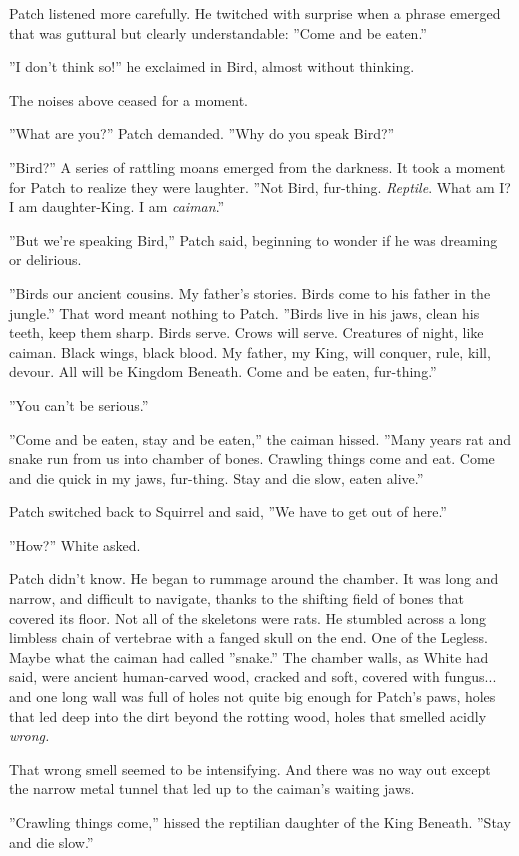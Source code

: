 \documentclass[12pt]{book}
\begin{document}
Patch listened more carefully. He twitched with surprise when a phrase emerged that was guttural but clearly understandable: ''Come and be eaten.''\par
 ''I don't think so!'' he exclaimed in Bird, almost without thinking.\par
 The noises above ceased for a moment.\par
 ''What are you?'' Patch demanded. ''Why do you speak Bird?''\par
 ''Bird?'' A series of rattling moans emerged from the darkness. It took a moment for Patch to realize they were laughter. ''Not Bird, fur-thing. {\it Reptile}. What am I? I am daughter-King. I am {\it caiman}.''\par
 ''But we're speaking Bird,'' Patch said, beginning to wonder if he was dreaming or delirious.\par
 ''Birds our ancient cousins. My father's stories. Birds come to his father in the jungle.'' That word meant nothing to Patch. ''Birds live in his jaws, clean his teeth, keep them sharp. Birds serve. Crows will serve. Creatures of night, like caiman. Black wings, black blood. My father, my King, will conquer, rule, kill, devour. All will be Kingdom Beneath. Come and be eaten, fur-thing.''\par
 ''You can't be serious.''\par
 ''Come and be eaten, stay and be eaten,'' the caiman hissed. ''Many years rat and snake run from us into chamber of bones. Crawling things come and eat. Come and die quick in my jaws, fur-thing. Stay and die slow, eaten alive.''\par
 Patch switched back to Squirrel and said, ''We have to get out of here.''\par
 ''How?'' White asked.\par
 Patch didn't know. He began to rummage around the chamber. It was long and narrow, and difficult to navigate, thanks to the shifting field of bones that covered its floor. Not all of the skeletons were rats. He stumbled across a long limbless chain of vertebrae with a fanged skull on the end. One of the Legless. Maybe what the caiman had called ''snake.'' The chamber walls, as White had said, were ancient human-carved wood, cracked and soft, covered with fungus... and one long wall was full of holes not quite big enough for Patch's paws, holes that led deep into the dirt beyond the rotting wood, holes that smelled acidly {\it wrong.} \par
That wrong smell seemed to be intensifying. And there was no way out except the narrow metal tunnel that led up to the caiman's waiting jaws.\par
 ''Crawling things come,'' hissed the reptilian daughter of the King Beneath. ''Stay and die slow.''\par
\end{document}
